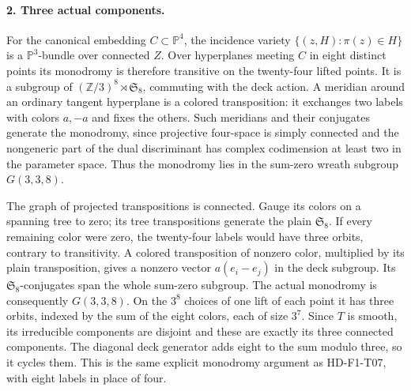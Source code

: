 \paragraph{2. Three actual components.}
For the canonical embedding $C\subset\mathbb P^4$, the incidence variety
$\{(z,H):\pi(z)\in H\}$ is a $\mathbb P^3$-bundle over connected $Z$.
Over hyperplanes meeting $C$ in eight distinct points its monodromy is
therefore transitive on the twenty-four lifted points. It is a subgroup
of $(\mathbb Z/3)^8\rtimes\mathfrak S_8$, commuting with the deck action.
A meridian around an ordinary tangent hyperplane is a colored
transposition: it exchanges two labels with colors $a,-a$ and fixes the
others. Such meridians and their conjugates generate the monodromy,
since projective four-space is simply connected and the nongeneric
part of the dual discriminant has complex codimension at least two
in the parameter space. Thus the monodromy lies in the sum-zero wreath
subgroup $G(3,3,8)$.

The graph of projected transpositions is connected. Gauge its colors
on a spanning tree to zero; its tree transpositions generate the plain
$\mathfrak S_8$. If every remaining color were zero, the twenty-four
labels would have three orbits, contrary to transitivity. A colored
transposition of nonzero color, multiplied by its plain transposition,
gives a nonzero vector $a(e_i-e_j)$ in the deck subgroup. Its
$\mathfrak S_8$-conjugates span the whole sum-zero subgroup. The actual
monodromy is consequently $G(3,3,8)$. On the $3^8$ choices of one lift
of each point it has three orbits, indexed by the sum of the eight
colors, each of size $3^7$. Since $T$ is smooth, its irreducible
components are disjoint and these are exactly its three connected
components. The diagonal deck generator adds eight to the sum modulo
three, so it cycles them. This is the same explicit monodromy argument
as HD-F1-T07, with eight labels in place of four.

